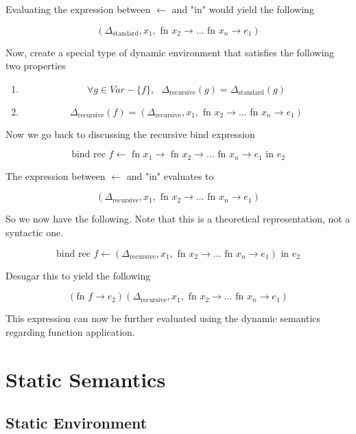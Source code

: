 \documentclass[titlepage]{article}
\begin{document}
Evaluating the expression between $\leftarrow$ and "in" would yield the following

$$(\Delta_{\text{standard}}, x_1, \text{ fn } x_2 \rightarrow \dots \text{ fn } x_n \rightarrow e_1)$$

Now, create a special type of dynamic environment that satisfies the following two properties

\begin{enumerate}
\item $$\forall g \in Var - \{f\}, \text{ } \Delta_\text{recursive} (g) = \Delta_\text{standard}(g)$$



\item $$\Delta_\text{recursive}(f) = (\Delta_{\text{recursive}}, x_1, \text{ fn } x_2 \rightarrow \dots \text{ fn } x_n \rightarrow e_1)$$


\end{enumerate}

Now we go back to discussing the recursive bind expression

$$\text{bind rec } f \leftarrow \text{ fn } x_1 \rightarrow \text{ fn } x_2 \rightarrow \dots \text{ fn } x_n \rightarrow e_1 \text{ in } e_2$$

The expression between $\leftarrow$ and "in" evaluates to

$$(\Delta_{\text{recursive}}, x_1, \text{ fn } x_2 \rightarrow \dots \text{ fn } x_n \rightarrow e_1)$$

So we now have the following. Note that this is a theoretical representation, not a syntactic one.

$$\text{bind rec } f \leftarrow (\Delta_{\text{recursive}}, x_1, \text{ fn } x_2 \rightarrow \dots \text{ fn } x_n \rightarrow e_1) \text{ in } e_2$$

Desugar this to yield the following

$$(\text{fn } f \rightarrow e_2) (\Delta_{\text{recursive}}, x_1, \text{ fn } x_2 \rightarrow \dots \text{ fn } x_n \rightarrow e_1)$$

This expression can now be further evaluated using the dynamic semantics regarding function application.

\newpage

\section{Static Semantics}

\subsection{Static Environment}
\end{document}
